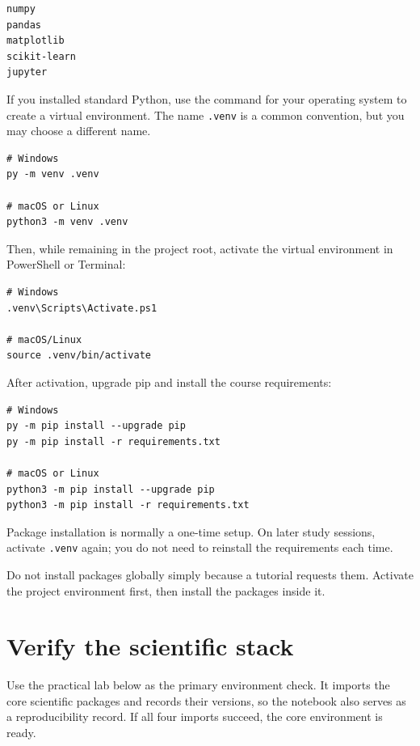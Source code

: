 \begin{lstlisting}[style=mlterminal]
numpy
pandas
matplotlib
scikit-learn
jupyter
\end{lstlisting}

If you installed standard Python, use the command for your operating system to create a virtual environment. The name \texttt{.venv} is a common convention, but you may choose a different name.

\begin{lstlisting}[style=mlterminal]
# Windows
py -m venv .venv

# macOS or Linux
python3 -m venv .venv
\end{lstlisting}

Then, while remaining in the project root, activate the virtual environment in PowerShell or Terminal:

\begin{lstlisting}[style=mlterminal]
# Windows
.venv\Scripts\Activate.ps1

# macOS/Linux
source .venv/bin/activate
\end{lstlisting}

After activation, upgrade pip and install the course requirements:

\begin{lstlisting}[style=mlterminal]
# Windows
py -m pip install --upgrade pip
py -m pip install -r requirements.txt

# macOS or Linux
python3 -m pip install --upgrade pip
python3 -m pip install -r requirements.txt
\end{lstlisting}

Package installation is normally a one-time setup. On later study sessions, activate \texttt{.venv} again; you do not need to reinstall the requirements each time.

\begin{keyidea}
Do not install packages globally simply because a tutorial requests them. Activate the project environment first, then install the packages inside it.
\end{keyidea}

\section{Verify the scientific stack}

Use the practical lab below as the primary environment check. It imports the core scientific packages and records their versions, so the notebook also serves as a reproducibility record. If all four imports succeed, the core environment is ready.


